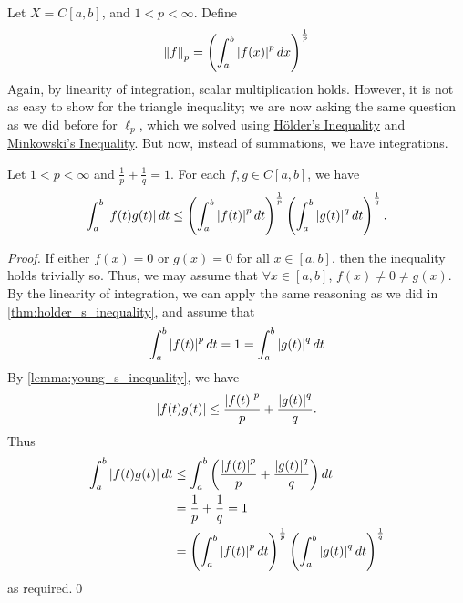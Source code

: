 \documentclass[notoc,notitlepage]{tufte-book}
\newcommand{\norm}[1]{\left\| #1 \right\|}
\begin{document}
\begin{eg}
  Let $X = C[a, b]$, and $1 < p < \infty$. Define
  \begin{equation*}
    \norm{f}_p = \left( \int_{a}^{b} \abs{f(x)}^p \dif{x} \right)^{\frac{1}{p}}
  \end{equation*}
  Again, by linearity of integration, scalar multiplication holds. However, it is not as easy to show for the triangle inequality; we are now asking the same question as we did before for $\ell_p$, which we solved using \hyperref[thm:holder_s_inequality]{H\"{o}lder's Inequality} and \hyperref[thm:minkowshi_s_inequality]{Minkowski's Inequality}. But now, instead of summations, we have integrations.
\end{eg}

\begin{thm}\label{thm:holder_s_inequality_v2}
  Let $1 < p < \infty$ and $\frac{1}{p} + \frac{1}{q} = 1$. For each $f, g \in C[a, b]$, we have
  \begin{equation*}
    \int_{a}^{b} \left|f(t)g(t)\right| \mathop{}\!d{t} \leq \left( \int_{a}^{b} \left|f(t)\right|^p \mathop{}\!d{t} \right)^\frac{1}{p} \left( \int_{a}^{b} \left|g(t)\right|^q \mathop{}\!d{t} \right)^\frac{1}{q}.
  \end{equation*}
\end{thm}

\begin{proof}
  If either $f(x) = 0$ or $g(x) = 0$ for all $x \in [a, b]$, then the inequality holds trivially so. Thus, we may assume that $\forall x \in [a, b]$, $f(x) \neq 0 \neq g(x)$. By the linearity of integration, we can apply the same reasoning as we did in \cref{thm:holder_s_inequality}, and assume that
  \begin{equation*}
    \int_{a}^{b} \left|f(t)\right|^p \mathop{}\!d{t} = 1 = \int_{a}^{b} \left|g(t)\right|^q \mathop{}\!d{t} 
  \end{equation*}
  By \cref{lemma:young_s_inequality}, we have
  \begin{equation*}
    \left|f(t) g(t)\right| \leq \frac{\left|f(t)\right|^p}{p} + \frac{\left|g(t)\right|^q}{q}.
  \end{equation*}
  Thus
  \begin{align*}
    \int_{a}^{b} \left|f(t) g(t)\right| \mathop{}\!d{t} &\leq \int_{a}^{b} \left( \frac{\left|f(t)\right|^p}{p} + \frac{\left|g(t)\right|^q}{q} \right) \mathop{}\!d{t} \\
                                         &= \frac{1}{p} + \frac{1}{q} = 1 \\
                                         &= \left( \int_{a}^{b} \left|f(t)\right|^p \mathop{}\!d{t} \right)^\frac{1}{p} \left( \int_{a}^{b} \left|g(t)\right|^q \mathop{}\!d{t} \right)^\frac{1}{q}
  \end{align*}
  as required.\qed
\end{proof}
\end{document}
